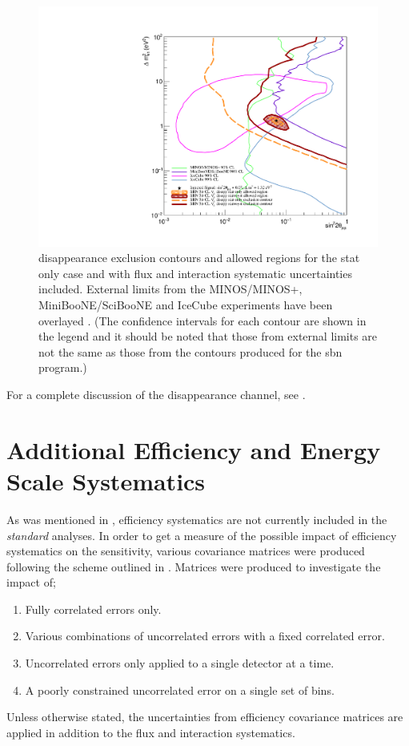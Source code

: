 \begin{figure}[h!]
    \centering
    \includegraphics[width = \largefigwidth]{figures-chap6/overlays/valor_overlays_numu_disapp.pdf}
    \caption[\numu disappearance contours with external limits.]{\numu disappearance exclusion contours and allowed regions for the stat only case and with flux and interaction systematic uncertainties included. External limits from the MINOS/MINOS+, MiniBooNE/SciBooNE and IceCube experiments have been overlayed \cite{MINOS_numu_disapp_contour}\cite{MiniBooNE/SciBooNE_numu_disapp_contour}\cite{IceCube_numu_disapp_contour}. (The confidence intervals for each contour are shown in the legend and it should be noted that those from external limits are not the same as those from the contours produced for the \gls{sbn} program.)}
    \label{fig:numu_disapp_global_sensitivity}
\end{figure}

For a complete discussion of the \numu disappearance channel, see \cite{Rhiannon's_thesis}.

\clearpage
\section{Additional Efficiency and Energy Scale Systematics}

As was mentioned in , efficiency systematics are not currently included in the \textit{standard} analyses. In order to get a measure of the possible impact of efficiency systematics on the sensitivity, various covariance matrices were produced following the scheme outlined in . Matrices were produced to investigate the impact of;
\begin{enumerate}
    \item Fully correlated errors only.
    \item Various combinations of uncorrelated errors with a fixed correlated error.
    \item Uncorrelated errors only applied to a single detector at a time.
    \item A poorly constrained uncorrelated error on a single set of bins.
\end{enumerate}
Unless otherwise stated, the uncertainties from efficiency covariance matrices are applied in addition to the flux and interaction systematics. 

